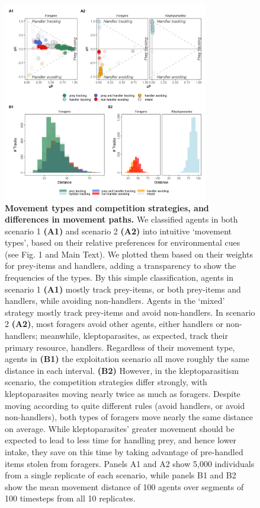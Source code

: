 \begin{figure}[h!]
    \centering
    \includegraphics[width=0.8\textwidth]{figures/patternprocess/fig_02.png}
    \caption{
        \textbf{Movement types and competition strategies, and differences in movement paths.}
        We classified agents in both scenario 1 \textbf{(A1)} and scenario 2 \textbf{(A2)} into intuitive `movement types', based on their relative preferences for environmental cues (see Fig. 1 and Main Text). 
        We plotted them based on their weights for prey-items and handlers, adding a transparency to show the frequencies of the types.
        By this simple classification, agents in scenario 1 \textbf{(A1)} mostly track prey-items, or both prey-items and handlers, while avoiding non-handlers.
        Agents in the `mixed' strategy mostly track prey-items and avoid non-handlers.
        In scenario 2 \textbf{(A2)}, most foragers avoid other agents, either handlers or non-handlers; meanwhile, kleptoparasites, as expected, track their primary resource, handlers.
        Regardless of their movement type, agents in \textbf{(B1)} the exploitation scenario all move roughly the same distance in each interval.
        \textbf{(B2)} However, in the kleptoparasitism scenario, the competition strategies differ strongly, with kleptoparasites moving nearly twice as much as foragers.
        Despite moving according to quite different rules (avoid handlers, or avoid non-handlers), both types of foragers move nearly the same distance on average.
        While kleptoparasites' greater movement should be expected to lead to less time for handling prey, and hence lower intake, they save on this time by taking advantage of pre-handled items stolen from foragers.
        Panels A1 and A2 show 5,000 individuals from a single replicate of each scenario, while panels B1 and B2 show the mean movement distance of 100 agents over segments of 100 timesteps from all 10 replicates.
    }
    \label{fig2}
\end{figure}

